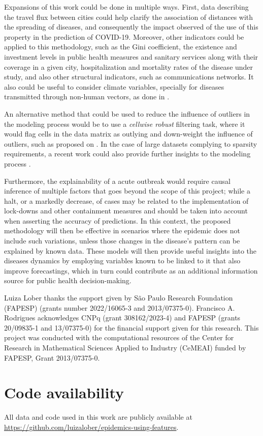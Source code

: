 Expansions of this work could be done in multiple ways. First, data describing the travel flux between cities could help clarify the association of distances with the spreading of diseases, and consequently the impact observed of the use of this property in the prediction of COVID-19. Moreover, other indicators could be applied to this methodology, such as the Gini coefficient, the existence and investment levels in public health measures and sanitary services along with their coverage in a given city, hospitalization and mortality rates of the disease under study, and also other structural indicators, such as communications networks. It also could be useful to consider climate variables, specially for diseases transmitted through non-human vectors, as done in \cite{Stolerman2019Aug}.

An alternative method that could be used to reduce the influence of outliers in the modeling process would be to use a \textit{cellwise robust} filtering task, where it would flag cells in the data matrix as outlying and down-weight the influence of outliers, such as proposed on \cite{Alqallaf2009Feb}. In the case of large datasets complying to sparsity requirements, a recent work could also provide further insights to the modeling process \cite{Bottmer2022Mar}.

Furthermore, the explainability of a acute outbreak would require causal inference of multiple factors that goes beyond the scope of this project; while a halt, or a markedly decrease, of cases may be related to the implementation of lock-downs and other containment measures and should be taken into account when asserting the accuracy of predictions. In this context, the proposed methodology will then be effective in scenarios where the epidemic does not include such variations, unless those changes in the disease's pattern can be explained by known data. These models will then provide useful insights into the diseases dynamics by employing variables known to be linked to it that also improve forecastings, which in turn could contribute as an additional information source for public health decision-making.


\begin{acknowledgments}
    Luiza Lober thanks the support given by São Paulo Research Foundation (FAPESP) (grants number 2022/16065-3 and 2013/07375-0). Francisco A. Rodrigues acknowledges CNPq (grant 308162/2023-4) and FAPESP (grants 20/09835-1 and 13/07375-0) for the financial support given for this research. This project was conducted with the computational resources of the Center for Research in Mathematical Sciences Applied to Industry (CeMEAI) funded by FAPESP, Grant 2013/07375-0.
\end{acknowledgments}

\section*{Code availability}
All data and code used in this work are publicly available at \url{https://github.com/luizalober/epidemics-using-features}.




